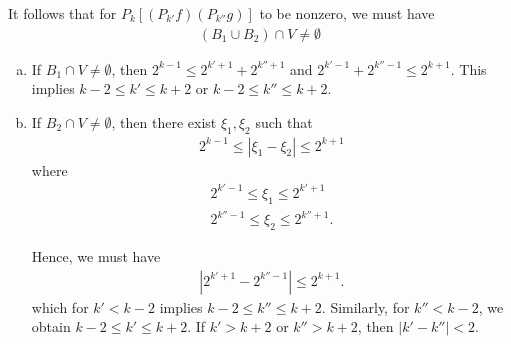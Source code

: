 \documentclass[12pt,reqno]{amsart}
\numberwithin{equation}{section}  %
\begin{document}
%
%
It follows that for $P_{k}\left[ (P_{k'}f)(P_{k''}g) \right ]$ to be nonzero, we must have 
  \begin{equation*}
  \begin{split}
    (B_{1} \cup B_{2}) \cap V \neq \emptyset
  \end{split}
  \end{equation*}
  \begin{enumerate}[a)]
  \item{}
    \label{ita}
    If $B_{1} \cap V \neq \emptyset$, then $2^{k-1} \le 2^{k'+1} + 2^{k'' + 1}$ and $2^{k'-1} + 2^{k''-1} \le 2^{k+1}$. This implies $k-2  \le k' \le k + 2$ or $k-2 \le k''\le k + 2$.
  \item{} 
    \label{itb}
    If $B_{2} \cap V \neq \emptyset$, then there exist $\xi_{1}, \xi_{2}$ such that
    \begin{equation*}
    \begin{split}
      2^{k-1} \le | \xi_{1} - \xi_{2} | \le 2^{k+1}
    \end{split}
    \end{equation*}
   where
   \begin{gather*}
     2^{k' -1} \le \xi_{1} \le 2^{k'+1}
     \\
     2^{k'' -1 } \le \xi_{2} \le 2^{k'' + 1}.
   \end{gather*}
  
 
%
\vspace{1cm}
\begin{center}
\end{center}
Hence, we must have
%
%
\begin{equation*}
\begin{split}
  | 2^{k' + 1} - 2^{k''-1} | \le 2^{k+1}.
\end{split}
\end{equation*}
%
%
which for $k' < k-2$ implies $k-2 \le k'' \le k+2$. Similarly, for $k'' < k-2$, we
obtain $k -2 \le k' \le k+2$. If $k' > k+2$ or $k'' > k+2$, then $|k' - k''| < 2$.%
%
%
\end{enumerate}
\end{document}
